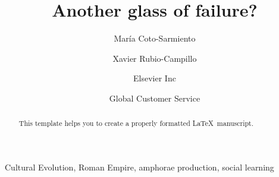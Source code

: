 \documentclass[review]{elsarticle}
\begin{document}
\begin{frontmatter}

\title{Another glass of failure? }

\author{Mar\'ia Coto-Sarmiento}
\author{Xavier Rubio-Campillo}
\address{Radarweg 29, Amsterdam}

\author[mymainaddress,mysecondaryaddress]{Elsevier Inc}

\author[mysecondaryaddress]{Global Customer Service}

\address[mymainaddress]{1600 John F Kennedy Boulevard, Philadelphia}
\address[mysecondaryaddress]{360 Park Avenue South, New York}

\begin{abstract}
This template helps you to create a properly formatted \LaTeX\ manuscript.
\end{abstract}

\begin{keyword}
Cultural Evolution, Roman Empire, amphorae production, social learning
\end{keyword}

\end{frontmatter}

\linenumbers



\end{document}
